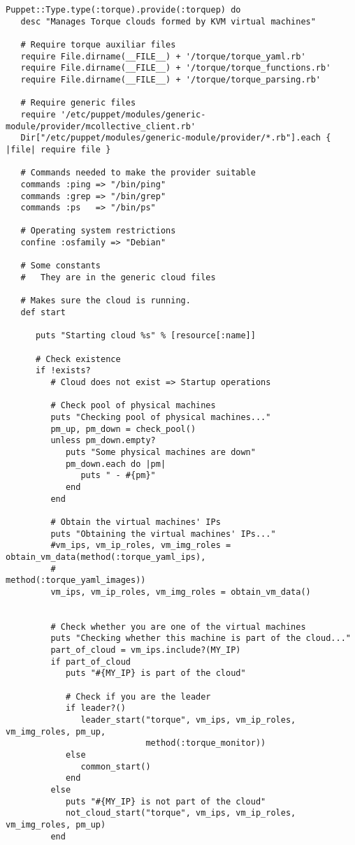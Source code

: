 \begin{lstlisting}
Puppet::Type.type(:torque).provide(:torquep) do
   desc "Manages Torque clouds formed by KVM virtual machines"

   # Require torque auxiliar files
   require File.dirname(__FILE__) + '/torque/torque_yaml.rb'
   require File.dirname(__FILE__) + '/torque/torque_functions.rb'
   require File.dirname(__FILE__) + '/torque/torque_parsing.rb'
   
   # Require generic files
   require '/etc/puppet/modules/generic-module/provider/mcollective_client.rb'
   Dir["/etc/puppet/modules/generic-module/provider/*.rb"].each { |file| require file }

   # Commands needed to make the provider suitable
   commands :ping => "/bin/ping"
   commands :grep => "/bin/grep"
   commands :ps   => "/bin/ps"
   
   # Operating system restrictions
   confine :osfamily => "Debian"

   # Some constants
   #   They are in the generic cloud files

   # Makes sure the cloud is running.
   def start

      puts "Starting cloud %s" % [resource[:name]]
      
      # Check existence
      if !exists?
         # Cloud does not exist => Startup operations
         
         # Check pool of physical machines
         puts "Checking pool of physical machines..."
         pm_up, pm_down = check_pool()
         unless pm_down.empty?
            puts "Some physical machines are down"
            pm_down.each do |pm|
               puts " - #{pm}"
            end
         end
         
         # Obtain the virtual machines' IPs
         puts "Obtaining the virtual machines' IPs..."
         #vm_ips, vm_ip_roles, vm_img_roles = obtain_vm_data(method(:torque_yaml_ips),
         #                                                   method(:torque_yaml_images))
         vm_ips, vm_ip_roles, vm_img_roles = obtain_vm_data()
         
         
         # Check whether you are one of the virtual machines
         puts "Checking whether this machine is part of the cloud..."
         part_of_cloud = vm_ips.include?(MY_IP)
         if part_of_cloud
            puts "#{MY_IP} is part of the cloud"
            
            # Check if you are the leader
            if leader?()
               leader_start("torque", vm_ips, vm_ip_roles, vm_img_roles, pm_up,
                            method(:torque_monitor))
            else
               common_start()
            end
         else
            puts "#{MY_IP} is not part of the cloud"
            not_cloud_start("torque", vm_ips, vm_ip_roles, vm_img_roles, pm_up)
         end
         

\end{lstlisting}

